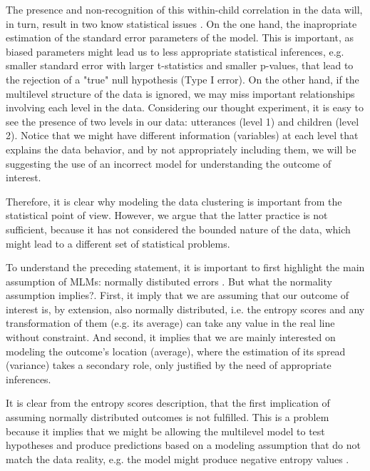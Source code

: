 The presence and non-recognition of this within-child correlation in the data will, in turn, result in two know statistical issues \citep{Finch_et_al_2019}. On the one hand, the inapropriate estimation of the standard error parameters of the model. This is important, as biased parameters might lead us to less appropriate statistical inferences, e.g. smaller standard error with larger t-statistics and smaller p-values, that lead to the rejection of a "true" null hypothesis (Type I error). On the other hand, if the multilevel structure of the data is ignored, we may miss important relationships involving each level in the data. Considering our thought experiment, it is easy to see the presence of two levels in our data: utterances (level 1) and children (level 2). Notice that we might have different information (variables) at each level that explains the data behavior, and by not appropriately including them, we will be suggesting the use of an incorrect model for understanding the outcome of interest.

Therefore, it is clear why modeling the data clustering is important from the statistical point of view. However, we argue that the latter practice is not sufficient, because it has not considered the bounded nature of the data, which might lead to a different set of statistical problems.

To understand the preceding statement, it is important to first highlight the main assumption of MLMs: normally distibuted errors \citep{Nelder_et_al_1983}. But what the normality assumption implies?. First, it imply that we are assuming that our outcome of interest is, by extension, also normally distributed, i.e. the entropy scores and any transformation of them (e.g. its average) can take any value in the real line without constraint. And second, it implies that we are mainly interested on modeling the outcome's location (average), where the estimation of its spread (variance) takes a secondary role, only justified by the need of appropriate inferences.

It is clear from the entropy scores description, that the first implication of assuming normally distributed outcomes is not fulfilled. This is a problem because it implies that we might be allowing the multilevel model to test hypotheses and produce predictions based on a modeling assumption that do not match the data reality, e.g. the model might produce negative entropy values \citep{McElreath_2020}.

